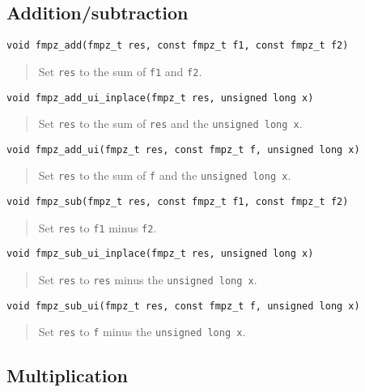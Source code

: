 \documentclass[a4paper,10pt]{article}
\newcommand{\code}{\lstinline}
\begin{document}
\subsection{Addition/subtraction}

\begin{lstlisting}
void fmpz_add(fmpz_t res, const fmpz_t f1, const fmpz_t f2)
\end{lstlisting}
\begin{quote}
Set \code{res} to the sum of \code{f1} and \code{f2}.
\end{quote}

\begin{lstlisting}
void fmpz_add_ui_inplace(fmpz_t res, unsigned long x)
\end{lstlisting}
\begin{quote}
Set \code{res} to the sum of \code{res} and the \code{unsigned long x}.
\end{quote}

\begin{lstlisting}
void fmpz_add_ui(fmpz_t res, const fmpz_t f, unsigned long x)
\end{lstlisting}
\begin{quote}
Set \code{res} to the sum of \code{f} and the \code{unsigned long x}.
\end{quote}

\begin{lstlisting}
void fmpz_sub(fmpz_t res, const fmpz_t f1, const fmpz_t f2)
\end{lstlisting}
\begin{quote}
Set \code{res} to \code{f1} minus \code{f2}.
\end{quote}

\begin{lstlisting}
void fmpz_sub_ui_inplace(fmpz_t res, unsigned long x)
\end{lstlisting}
\begin{quote}
Set \code{res} to \code{res} minus the \code{unsigned long x}.
\end{quote}

\begin{lstlisting}
void fmpz_sub_ui(fmpz_t res, const fmpz_t f, unsigned long x)
\end{lstlisting}
\begin{quote}
Set \code{res} to \code{f} minus the \code{unsigned long x}.
\end{quote}

\subsection{Multiplication}
\end{document}
